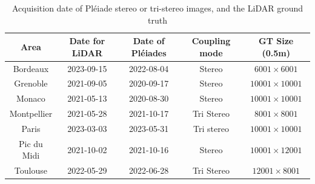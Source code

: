 \begin{table}[ht]
    \centering
    \begin{tabular}{|c||c|c|c|c|}
    \hline
        Area & Date for LiDAR & Date of Pléiades & Coupling mode & GT Size (0.5m)\\
        \hline\hline
        Bordeaux & 2023-09-15 & 2022-08-04 & Stereo & $6001\times 6001$\\\hline
        Grenoble & 2021-09-05 & 2020-09-17 & Stereo & $10 001\times 10 001$ \\\hline
        Monaco & 2021-05-13 & 2020-08-30 & Stereo & $10 001\times 10 001$\\\hline
        Montpellier & 2021-05-28 & 2021-10-17 & Tri Stereo & $8001\times 8001$\\\hline
        Paris & 2023-03-03 & 2023-05-31 & Tri stereo & $10 001\times 10 001$\\\hline
        Pic du Midi & 2021-10-02 & 2021-10-16 & Stereo & $10001 \times 12001$ \\\hline
        Toulouse & 2022-05-29 & 2022-06-28 & Tri Stereo & $12001\times 8001$\\\hline
    \end{tabular}
    \caption{Acquisition date of Pléiade stereo or tri-stereo images, and the LiDAR ground truth}
    \label{tab:my_label}
\end{table}

\pagebreak
\blankpage